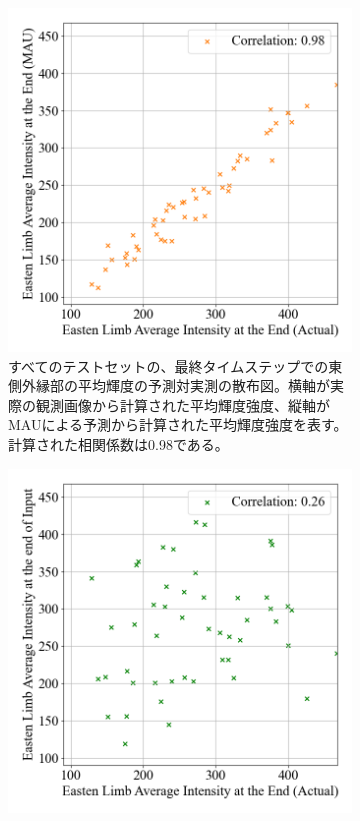         \begin{figure}[htbp]
          \begin{subfigure}[b]{0.55\textwidth}
            \centering
            \includegraphics[width=\textwidth]{figures/exp2/limb_scatter_gt_pd.png}
            \caption{すべてのテストセットの、最終タイムステップでの東側外縁部の平均輝度の予測対実測の散布図。横軸が実際の観測画像から計算された平均輝度強度、縦軸がMAUによる予測から計算された平均輝度強度を表す。計算された相関係数は0.98である。}
          \end{subfigure}
          \begin{subfigure}[b]{0.55\textwidth}
            \centering
            \includegraphics[width=\textwidth]{figures/exp2/limb_scatter_gt_sp.png}

\end{subfigure}
\end{figure}

